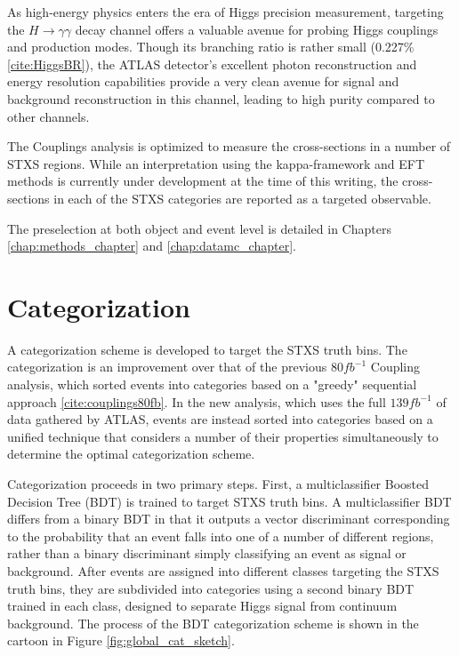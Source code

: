 
As high-energy physics enters the era of Higgs precision measurement, targeting the $H \rightarrow \gamma \gamma$ decay channel offers a valuable avenue for probing Higgs couplings and production modes. Though its branching ratio is rather small (0.227\% \ref{cite:HiggsBR}), the ATLAS detector's excellent photon reconstruction and energy resolution capabilities provide a very clean avenue for signal and background reconstruction in this channel, leading to high purity compared to other channels.

The Couplings analysis is optimized to measure the cross-sections in a number of STXS regions. While an interpretation using the kappa-framework and EFT methods is currently under development at the time of this writing, the cross-sections in each of the STXS categories are reported as a targeted observable.

The preselection at both object and event level is detailed in Chapters \ref{chap:methods_chapter} and \ref{chap:datamc_chapter}.

\section{Categorization} \label{sec:Categorization} 

A categorization scheme is developed to target the STXS truth bins. The categorization is an improvement over that of the previous $80 fb^{-1}$ Coupling analysis, which sorted events into categories based on a "greedy" sequential approach \ref{cite:couplings80fb}. In the new analysis, which uses the full $139 fb^{-1}$ of data gathered by ATLAS, events are instead sorted into categories based on a unified technique that considers a number of their properties simultaneously to determine the optimal categorization scheme.

Categorization proceeds in two primary steps. First, a multiclassifier Boosted Decision Tree (BDT) is trained to target STXS truth bins. A multiclassifier BDT differs from a binary BDT in that it outputs a vector discriminant corresponding to the probability that an event falls into one of a number of different regions, rather than a binary discriminant simply classifying an event as signal or background. After events are assigned into different classes targeting the STXS truth bins, they are subdivided into categories using a second binary BDT trained in each class, designed to separate Higgs signal from continuum background. The process of the BDT categorization scheme is shown in the cartoon in Figure \ref{fig:global_cat_sketch}.

